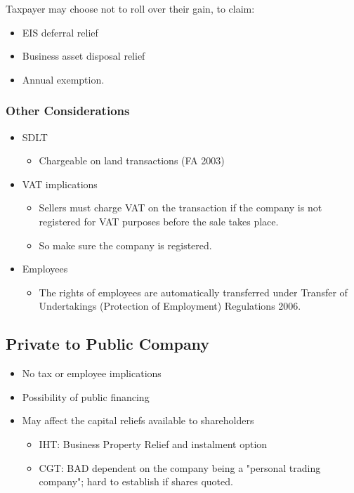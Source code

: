 \documentclass[
]{article}
\providecommand{\tightlist}{%
  \setlength{\itemsep}{0pt}\setlength{\parskip}{0pt}}
\begin{document}
Taxpayer may choose not to roll over their gain, to claim:

\begin{itemize}
\tightlist
\item
  EIS deferral relief
\item
  Business asset disposal relief
\item
  Annual exemption.
\end{itemize}

\hypertarget{other-considerations}{%
\subsubsection{Other Considerations}\label{other-considerations}}

\begin{itemize}
\tightlist
\item
  SDLT

  \begin{itemize}
  \tightlist
  \item
    Chargeable on land transactions (FA 2003)
  \end{itemize}
\item
  VAT implications

  \begin{itemize}
  \tightlist
  \item
    Sellers must charge VAT on the transaction if the company is not
    registered for VAT purposes before the sale takes place.
  \item
    So make sure the company is registered.
  \end{itemize}
\item
  Employees

  \begin{itemize}
  \tightlist
  \item
    The rights of employees are automatically transferred under Transfer
    of Undertakings (Protection of Employment) Regulations 2006.
  \end{itemize}
\end{itemize}

\hypertarget{private-to-public-company}{%
\subsection{Private to Public Company}\label{private-to-public-company}}

\begin{itemize}
\tightlist
\item
  No tax or employee implications
\item
  Possibility of public financing
\item
  May affect the capital reliefs available to shareholders

  \begin{itemize}
  \tightlist
  \item
    IHT: Business Property Relief and instalment option
  \item
    CGT: BAD dependent on the company being a "personal trading
    company"; hard to establish if shares quoted.
  \end{itemize}
\end{itemize}
\end{document}
